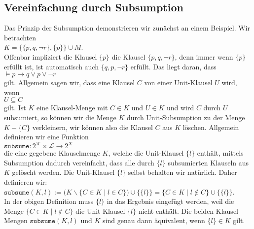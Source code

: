 \subsection{Vereinfachung durch Subsumption}
Das Prinzip der Subsumption demonstrieren wir zunächst an einem Beispiel.
Wir betrachten \\[0.2cm]
\hspace*{1.3cm} $K = \bigl\{ \{p, q, \neg r\}, \{p\} \bigr\} \cup M$. \\[0.2cm]
Offenbar impliziert die Klausel $\{p\}$ die Klausel $\{p, q, \neg r\}$, denn immer wenn
$\{p\}$ erfüllt ist, ist automatisch auch $\{q, p, \neg r\}$ erfüllt.  Das liegt daran, dass 
\\[0.2cm]
\hspace*{1.3cm} $\models p \rightarrow q \vee p \vee \neg r$
\\[0.2cm]
gilt.  Allgemein sagen wir, dass eine Klausel $C$
 von einer Unit-Klausel $U$  wird, wenn
\\[0.2cm]
\hspace*{1.3cm} $U \subseteq C$ \\[0.2cm]
gilt.  Ist $K$ eine Klausel-Menge mit $C \in K$ und $U \in K$ und wird
$C$ durch $U$ subsumiert, so können wir die Menge $K$ durch Unit-Subsumption zu der Menge $K - \{ C \}$
verkleinern, wir können also die Klausel $C$ aus $K$ löschen.  Allgemein definieren wir eine Funktion
\\[0.2cm]
\hspace*{1.3cm}
$\texttt{subsume}: 2^\mathcal{K} \times \mathcal{L} \rightarrow 2^\mathcal{K}$
\\[0.2cm]
die eine gegebene Klauselmenge $K$, welche die Unit-Klausel $\{l\}$ enthält, mittels Subsumption 
dadurch vereinfacht, dass alle durch $\{l\}$ subsumierten Klauseln aus $K$ gelöscht werden.
Die Unit-Klausel $\{l\}$ selbst behalten wir natürlich.  Daher definieren wir:
\\[0.2cm]
\hspace*{1.3cm}
$\texttt{subsume}(K, l) := 
\bigl(K \backslash \bigl\{ C \in K \mid l \in C \bigr\}\bigr) \cup \bigl\{\{l\}\bigr\} = 
\bigl\{ C \in K \mid l \not\in C \bigr\} \cup \bigl\{\{l\}\bigr\}$.
\\[0.2cm]
In der obigen Definition muss $\{l\}$ in das Ergebnis eingefügt werden, weil die Menge
\mbox{$\bigl\{ C \in K \mid l \not\in C \bigr\}$} die Unit-\-Klausel $\{l\}$ nicht enthält.  Die beiden Klausel-Mengen
$\mathtt{subsume}(K,l)$ und $K$ sind genau dann äquivalent, wenn $\{l\} \in K$ gilt.

